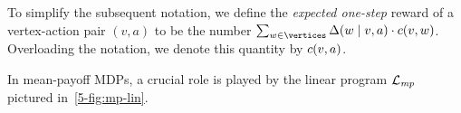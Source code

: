 




To simplify the subsequent notation, we define the \emph{expected one-step} reward of a vertex-action pair $(v,a)$ to be the number $\sum_{w\in \vertices} \probTranFunc(w\mid v,a)\cdot \colouring(v,w)$. Overloading the notation, we denote this quantity by $c(v,a)$.

In mean-payoff  MDPs, a crucial role is played by the linear program $\mathcal{L}_{\mathit{mp}}$ pictured in~\cref{5-fig:mp-lin}.

